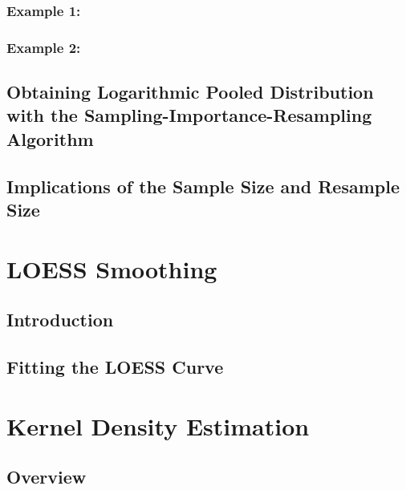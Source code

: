 \documentclass[12pt,twoside]{smiththesis}
\begin{document}
\hypertarget{example-1}{%
\subsubsection{Example 1:}\label{example-1}}

\hypertarget{example-2}{%
\subsubsection{Example 2:}\label{example-2}}

\hypertarget{logpooled}{%
\subsection{Obtaining Logarithmic Pooled Distribution with the Sampling-Importance-Resampling Algorithm}\label{logpooled}}

\hypertarget{presamp}{%
\subsection{Implications of the Sample Size and Resample Size}\label{presamp}}

\hypertarget{loess-smoothing}{%
\section{LOESS Smoothing}\label{loess-smoothing}}

\hypertarget{introduction}{%
\subsection{Introduction}\label{introduction}}

\hypertarget{fitting-the-loess-curve}{%
\subsection{Fitting the LOESS Curve}\label{fitting-the-loess-curve}}

\hypertarget{kernel-density-estimation}{%
\section{Kernel Density Estimation}\label{kernel-density-estimation}}

\hypertarget{overview-1}{%
\subsection{Overview}\label{overview-1}}
\end{document}
